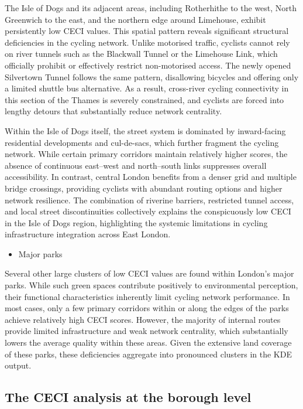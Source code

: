\documentclass[
  12pt,
  oneside]{book}
\providecommand{\tightlist}{%
  \setlength{\itemsep}{0pt}\setlength{\parskip}{0pt}}
\begin{document}
The Isle of Dogs and its adjacent areas, including Rotherhithe to the west, North Greenwich to the east, and the northern edge around Limehouse, exhibit persistently low CECI values. This spatial pattern reveals significant structural deficiencies in the cycling network. Unlike motorised traffic, cyclists cannot rely on river tunnels such as the Blackwall Tunnel or the Limehouse Link, which officially prohibit or effectively restrict non-motorised access. The newly opened Silvertown Tunnel follows the same pattern, disallowing bicycles and offering only a limited shuttle bus alternative. As a result, cross-river cycling connectivity in this section of the Thames is severely constrained, and cyclists are forced into lengthy detours that substantially reduce network centrality.

Within the Isle of Dogs itself, the street system is dominated by inward-facing residential developments and cul-de-sacs, which further fragment the cycling network. While certain primary corridors maintain relatively higher scores, the absence of continuous east--west and north--south links suppresses overall accessibility. In contrast, central London benefits from a denser grid and multiple bridge crossings, providing cyclists with abundant routing options and higher network resilience. The combination of riverine barriers, restricted tunnel access, and local street discontinuities collectively explains the conspicuously low CECI in the Isle of Dogs region, highlighting the systemic limitations in cycling infrastructure integration across East London.

\begin{itemize}
\tightlist
\item
  Major parks
\end{itemize}

Several other large clusters of low CECI values are found within London's major parks. While such green spaces contribute positively to environmental perception, their functional characteristics inherently limit cycling network performance. In most cases, only a few primary corridors within or along the edges of the parks achieve relatively high CECI scores. However, the majority of internal routes provide limited infrastructure and weak network centrality, which substantially lowers the average quality within these areas. Given the extensive land coverage of these parks, these deficiencies aggregate into pronounced clusters in the KDE output.

\subsection{The CECI analysis at the borough level}\label{the-ceci-analysis-at-the-borough-level}
\end{document}
